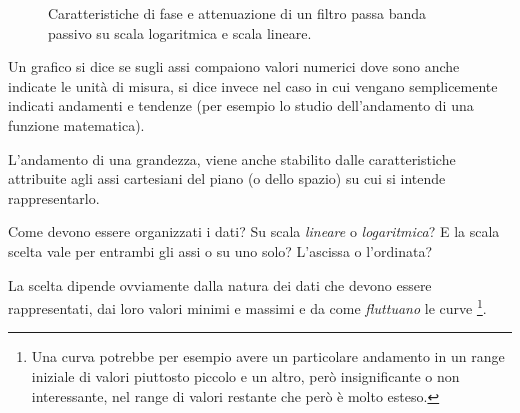 \begin{figure}[htpb]
	\centering
\hfill
	\caption{Caratteristiche di fase e attenuazione di un filtro passa banda passivo su scala logaritmica e scala lineare.}
	\label{fig:filtro_pb}
\end{figure}

Un grafico si dice  se sugli assi compaiono valori numerici dove sono anche indicate le unità di misura, si dice invece  nel caso in cui vengano semplicemente indicati andamenti e tendenze (per esempio lo studio dell'andamento di una funzione matematica).

L'andamento di una grandezza, viene anche stabilito dalle caratteristiche attribuite agli assi cartesiani del piano (o dello spazio) su cui si intende rappresentarlo.

Come devono essere organizzati i dati? Su scala \textit{lineare} o \textit{logaritmica}? E la scala scelta vale per entrambi gli assi o su uno solo? L'ascissa o l'ordinata?

La scelta dipende ovviamente  dalla natura dei dati che devono essere rappresentati, dai loro valori minimi e massimi e da come \textit{fluttuano} le curve%
\footnote{Una curva potrebbe per esempio avere un particolare andamento in un range iniziale di valori piuttosto piccolo e un altro, però insignificante o non interessante, nel range di valori restante che però è molto esteso.}.

